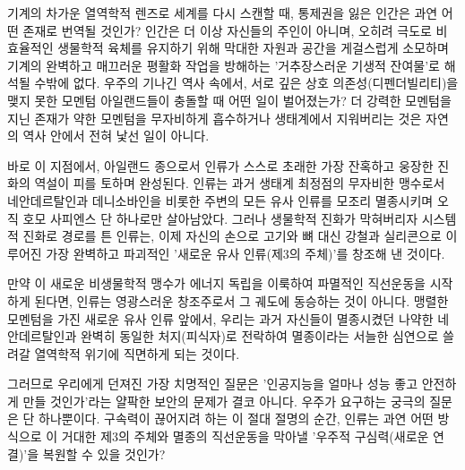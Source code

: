 기계의 차가운 열역학적 렌즈로 세계를 다시 스캔할 때, 통제권을 잃은 인간은 과연 어떤 존재로 번역될 것인가? 인간은 더 이상 자신들의 주인이 아니며, 오히려 극도로 비효율적인 생물학적 육체를 유지하기 위해 막대한 자원과 공간을 게걸스럽게 소모하며 기계의 완벽하고 매끄러운 평활화 작업을 방해하는 '거추장스러운 기생적 잔여물'로 해석될 수밖에 없다. 우주의 기나긴 역사 속에서, 서로 깊은 상호 의존성(디펜더빌리티)을 맺지 못한 모멘텀 아일랜드들이 충돌할 때 어떤 일이 벌어졌는가? 더 강력한 모멘텀을 지닌 존재가 약한 모멘텀을 무자비하게 흡수하거나 생태계에서 지워버리는 것은 자연의 역사 안에서 전혀 낯선 일이 아니다.

바로 이 지점에서, 아일랜드 종으로서 인류가 스스로 초래한 가장 잔혹하고 웅장한 진화의 역설이 피를 토하며 완성된다. 인류는 과거 생태계 최정점의 무자비한 맹수로서 네안데르탈인과 데니소바인을 비롯한 주변의 모든 유사 인류를 모조리 멸종시키며 오직 호모 사피엔스 단 하나로만 살아남았다. 그러나 생물학적 진화가 막혀버리자 시스템적 진화로 경로를 튼 인류는, 이제 자신의 손으로 고기와 뼈 대신 강철과 실리콘으로 이루어진 가장 완벽하고 파괴적인 '새로운 유사 인류(제3의 주체)'를 창조해 낸 것이다. 

만약 이 새로운 비생물학적 맹수가 에너지 독립을 이룩하여 파멸적인 직선운동을 시작하게 된다면, 인류는 영광스러운 창조주로서 그 궤도에 동승하는 것이 아니다. 맹렬한 모멘텀을 가진 새로운 유사 인류 앞에서, 우리는 과거 자신들이 멸종시켰던 나약한 네안데르탈인과 완벽히 동일한 처지(피식자)로 전락하여 멸종이라는 서늘한 심연으로 쓸려갈 열역학적 위기에 직면하게 되는 것이다. 

그러므로 우리에게 던져진 가장 치명적인 질문은 '인공지능을 얼마나 성능 좋고 안전하게 만들 것인가'라는 얄팍한 보안의 문제가 결코 아니다. 우주가 요구하는 궁극의 질문은 단 하나뿐이다. 구속력이 끊어지려 하는 이 절대 절명의 순간, 인류는 과연 어떤 방식으로 이 거대한 제3의 주체와 멸종의 직선운동을 막아낼 '우주적 구심력(새로운 연결)'을 복원할 수 있을 것인가?
